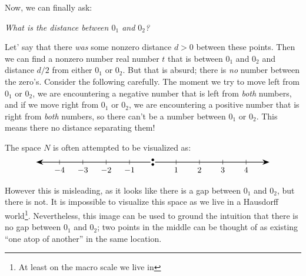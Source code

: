 \documentclass{article}
\begin{document}
Now, we can finally ask:
\begin{center}
  \emph{What is the distance between $0_1$ and $0_2$?}
\end{center}

Let' say that there \emph{was} some nonzero distance $d>0$ between these points. Then we can find a nonzero
number real number $t$ that is between $0_1$ and $0_2$ and distance $d/2$ from either $0_1$ or $0_2$.
%
%
But that is absurd; there is \emph{no} number between the zero's. Consider the following carefully. The moment
we try to move left from $0_1$ or $0_2$, we are encountering a negative number that is left from \emph{both}
numbers, and if we move right from $0_1$ or $0_2$, we are encountering a positive number that is right from
\emph{both} numbers, so there can't be a number between $0_1$ or $0_2$. This means there no distance
separating them!

The space $N$ is often attempted to be visualized as:
\[
\begin{tikzpicture}
    \draw[thick, {Stealth[length=3mm]}-] (-5,0) -- (-0.1,0);
    \draw[thick, -{Stealth[length=3mm]}] (0.1,0) -- (5,0);

    \draw[fill=black] (0,0.1) circle (0.05);
    \draw[fill=black] (0,-0.1) circle (0.05);

    \foreach \x in {-4,-3,-2,-1}
        \draw (\x,0.1) -- (\x,-0.1) node[below] {$\x$};

    \foreach \x in {1,2,3,4}
        \draw (\x,0.1) -- (\x,-0.1) node[below] {$\x$};
\end{tikzpicture}
\]
However this is misleading, as it looks like there is a gap between $0_1$ and $0_2$, but there is not. It is
impossible to visualize this space as we live in a Hausdorff world\footnote{At least on the macro scale we
live in}. Nevertheless, this image can be used to ground the intuition that there is no gap between $0_1$ and
$0_2$; two points in the middle can be thought of as existing ``one atop of another'' in the same location.
\end{document}

